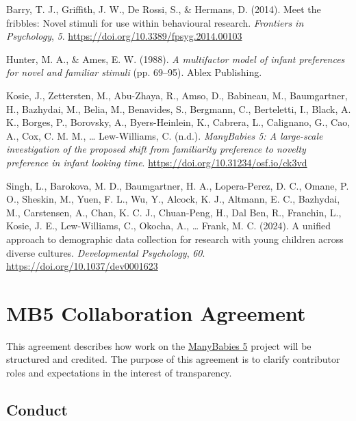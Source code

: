 \documentclass[
  letterpaper,
  DIV=11,
  numbers=noendperiod,
  oneside]{scrreprt}
\newlength{\cslhangindent}
\newenvironment{CSLReferences}[2] %
 {\begin{list}{}{%
  \setlength{\itemindent}{0pt}
  \setlength{\leftmargin}{0pt}
  \setlength{\parsep}{0pt}
  \ifodd #1
   \setlength{\leftmargin}{\cslhangindent}
   \setlength{\itemindent}{-1\cslhangindent}
  \fi
  \setlength{\itemsep}{#2\baselineskip}}}
 {\end{list}}
\begin{document}
\label{refs}
\begin{CSLReferences}{1}{0}
Barry, T. J., Griffith, J. W., De Rossi, S., \& Hermans, D. (2014). Meet
the fribbles: Novel stimuli for use within behavioural research.
\emph{Frontiers in Psychology}, \emph{5}.
\url{https://doi.org/10.3389/fpsyg.2014.00103}

Hunter, M. A., \& Ames, E. W. (1988). \emph{A multifactor model of
infant preferences for novel and familiar stimuli} (pp. 69--95). Ablex
Publishing.

Kosie, J., Zettersten, M., Abu-Zhaya, R., Amso, D., Babineau, M.,
Baumgartner, H., Bazhydai, M., Belia, M., Benavides, S., Bergmann, C.,
Berteletti, I., Black, A. K., Borges, P., Borovsky, A., Byers-Heinlein,
K., Cabrera, L., Calignano, G., Cao, A., Cox, C. M. M., \ldots{}
Lew-Williams, C. (n.d.). \emph{ManyBabies 5: A large-scale investigation
of the proposed shift from familiarity preference to novelty preference
in infant looking time}. \url{https://doi.org/10.31234/osf.io/ck3vd}

Singh, L., Barokova, M. D., Baumgartner, H. A., Lopera-Perez, D. C.,
Omane, P. O., Sheskin, M., Yuen, F. L., Wu, Y., Alcock, K. J., Altmann,
E. C., Bazhydai, M., Carstensen, A., Chan, K. C. J., Chuan-Peng, H., Dal
Ben, R., Franchin, L., Kosie, J. E., Lew-Williams, C., Okocha, A.,
\ldots{} Frank, M. C. (2024). A unified approach to demographic data
collection for research with young children across diverse cultures.
\emph{Developmental Psychology}, \emph{60}.
\url{https://doi.org/10.1037/dev0001623}

\end{CSLReferences}

\cleardoublepage
{}
{}
\appendix

\chapter{MB5 Collaboration Agreement}\label{sec-collaboration}

This agreement describes how work on the
\href{https://manybabies.org/MB5/}{ManyBabies 5} project will be
structured and credited. The purpose of this agreement is to clarify
contributor roles and expectations in the interest of transparency.

\section*{Conduct}\label{conduct}
\end{document}
